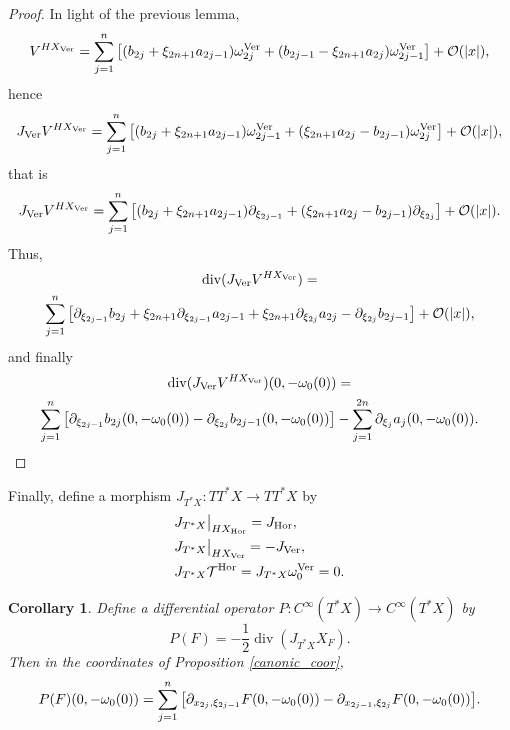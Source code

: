 \documentclass{article}
\newtheorem{corollary}[theorem]{Corollary}
\newcommand{\mct}{\mathcal T}
\newcommand{\mco}{\mathcal O}
\DeclareMathOperator{\Div}{div}
\DeclareMathOperator{\Hor}{Hor}
\DeclareMathOperator{\Ver}{Ver}
\begin{document}
\begin{proof}
In light of the previous lemma,
%
$$V^{HX_{\Ver}} = \sum_{j=1}^n \big{[}(b_{2j} + \xi_{2n+1} a_{2j-1}) \omega^{\Ver}_{2j} +(b_{2j-1} - \xi_{2n+1} a_{2j}) \omega_{2j-1}^{\Ver} \big{]} + \mco(|x|),$$
hence
$$J_{\Ver}V^{HX_{\Ver}} = \sum_{j=1}^n \big{[}(b_{2j} + \xi_{2n+1} a_{2j-1}) \omega^{\Ver}_{2j-1} +(\xi_{2n+1} a_{2j}-b_{2j-1}) \omega_{2j}^{\Ver} \big{]} + \mco(|x|),$$
that is $$J_{\Ver} V^{HX_{\Ver}} =\sum_{j=1}^n \big{[}(b_{2j} + \xi_{2n+1} a_{2j-1}) \partial_{\xi_{2j-1}} +(\xi_{2n+1} a_{2j}-b_{2j-1}) \partial_{\xi_{2j}} \big{]} + \mco(|x|).$$
Thus, \begin{multline*} \Div(J_{\Ver}V^{HX_{\Ver}}) = \\\sum_{j=1}^n \big{[} \partial_{\xi_{2j-1}} b_{2j} + \xi_{2n+1} \partial_{\xi_{2j-1}} a_{2j-1} + \xi_{2n+1} \partial_{\xi_{2j}} a_{2j} - \partial_{\xi_{2j}} b_{2j-1} \big{]} + \mco(|x|),\end{multline*}
and finally
\begin{multline*} \Div(J_{\Ver}V^{HX_{\Ver}})(0, -\omega_0(0)) = \\\sum_{j=1}^n \big{[} \partial_{\xi_{2j-1}} b_{2j}(0, -\omega_0(0)) - \partial_{\xi_{2j}} b_{2j-1}(0, -\omega_0(0)) \big{]} -\sum_{j=1}^{2n} \partial_{\xi_j} a_j(0, -\omega_0(0)).\end{multline*}
\end{proof}
%
Finally, define a morphism $J_{T^*X} : T T^*X \to T T^*X$ by \begin{equation}\label{lifted_J}\begin{aligned} &J_{T^*X} \big{|}_{HX_{\Hor}} = J_{\Hor},\\ &J_{T^*X} \big{|}_{HX_{\Ver}} = - J_{\Ver},\\ &J_{T^*X} \mct^{\Hor} = J_{T^*X} \omega_0^{\Ver} = 0. \end{aligned}\end{equation}
%
%
\begin{corollary}\label{div_jhamvf} Define a differential operator $P : C^\infty(T^*X) \to C^\infty(T^*X)$ by $$P(F) = -\frac 1 2\Div(J_{T^*X} X_F).$$
Then in the coordinates of Proposition \ref{canonic_coor}, $$P(F)(0, -\omega_0(0)) = \sum_{j=1}^n\big{[}\partial_{x_{2j}, \xi_{2j-1}} F(0,-\omega_0(0)) - \partial_{x_{2j-1}, \xi_{2j}} F(0, -\omega_0(0))\big{]}.$$
%
\end{corollary}
%
\end{document}
